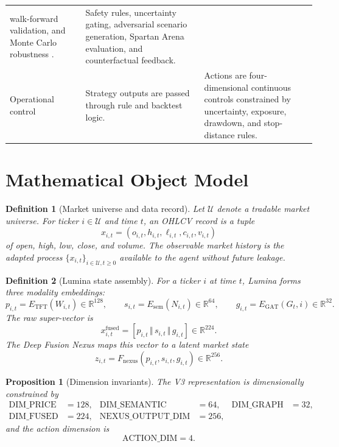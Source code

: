 \documentclass[10pt]{article}
\newtheorem{definition}{Definition}[section]
\newtheorem{proposition}{Proposition}[section]
\newcommand{\R}{\mathbb{R}}
\begin{document}
\begin{table}[htbp]
\begin{tabularx}{\textwidth}{p{}XX}
		walk-forward validation, and Monte Carlo robustness \cite{markowitz1952,sharpe1966}. &
		Safety rules, uncertainty gating, adversarial scenario generation, Spartan Arena
		evaluation, and counterfactual feedback.                                                                                                                                \\
		Operational control                                                                  & Strategy outputs are passed through rule and backtest logic.         &
		Actions are four-dimensional continuous controls constrained by uncertainty, exposure,
		drawdown, and stop-distance rules.                                                                                                                                      \\
		\bottomrule
	\end{tabularx}
\end{table}

\section{Mathematical Object Model}

\begin{definition}[Market universe and data record]
	Let \(\mathcal{U}\) denote a tradable market universe. For ticker \(i\in\mathcal{U}\) and
	time \(t\), an OHLCV record is a tuple
	\[
		x_{i,t}=(o_{i,t},h_{i,t},\ell_{i,t},c_{i,t},v_{i,t})
	\]
	of open, high, low, close, and volume. The observable market history is the adapted process
	\(\{x_{i,t}\}_{i\in\mathcal{U},t\ge 0}\) available to the agent without future leakage.
\end{definition}

\begin{definition}[Lumina state assembly]
	For a ticker \(i\) at time \(t\), Lumina forms three modality embeddings:
	\[
		p_{i,t}=E_{\mathrm{TFT}}(W_{i,t})\in\R^{128},\qquad
		s_{i,t}=E_{\mathrm{sem}}(N_{i,t})\in\R^{64},\qquad
		g_{i,t}=E_{\mathrm{GAT}}(G_t,i)\in\R^{32}.
	\]
	The raw super-vector is
	\[
		x^{\mathrm{fused}}_{i,t}
		=
		[p_{i,t}\,\Vert\,s_{i,t}\,\Vert\,g_{i,t}]
		\in\R^{224}.
	\]
	The Deep Fusion Nexus maps this vector to a latent market state
	\[
		z_{i,t}=F_{\mathrm{nexus}}(p_{i,t},s_{i,t},g_{i,t})\in\R^{256}.
	\]
\end{definition}

\begin{proposition}[Dimension invariants]
	The V3 representation is dimensionally constrained by
	\[
		\begin{aligned}
			\mathrm{DIM\_PRICE}         & = 128, &
			\mathrm{DIM\_SEMANTIC}      & = 64,  &
			\mathrm{DIM\_GRAPH}         & = 32,    \\
			\mathrm{DIM\_FUSED}         & = 224, &
			\mathrm{NEXUS\_OUTPUT\_DIM} & = 256,
		\end{aligned}
	\]
	and the action dimension is
	\[
		\mathrm{ACTION\_DIM}=4.
	\]
\end{proposition}
\end{document}
